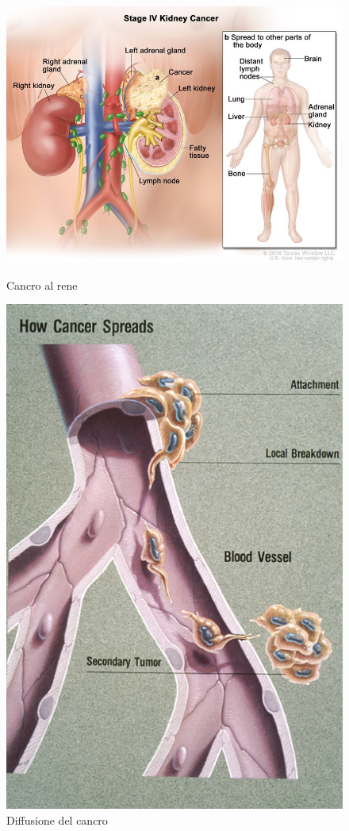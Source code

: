\begin{figure}[h]
    \begin{minipage}{.5 \textwidth}
        \centering
        \includegraphics[width=0.75 \textwidth]{Images/1_tumor.jpg}
        \caption{\small Cancro al rene}
        \label{fig:kidney-cancer}
    \end{minipage}%
    \begin{minipage}{.5 \textwidth}
        \centering
        \includegraphics[width=0.35 \textwidth]{./Images/1_metastasi_spread.jpg}
        \caption{\small Diffusione del cancro}
        \label{fig:metastasi}
    \end{minipage}
\end{figure}

